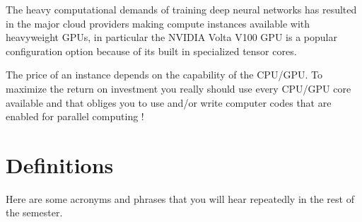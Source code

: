 The heavy computational demands of training deep neural networks has resulted in the major cloud providers making compute instances available with heavyweight GPUs, in particular the NVIDIA Volta V100 GPU is a popular configuration option because of its built in specialized tensor cores.

The price of an instance depends on the capability of the CPU/GPU. To maximize the return on investment you really should use every CPU/GPU core available and that obliges you to use and/or write computer codes that are enabled for parallel computing !


\section{Definitions}

Here are some acronyms and phrases that you will hear repeatedly in the rest of the semester.

